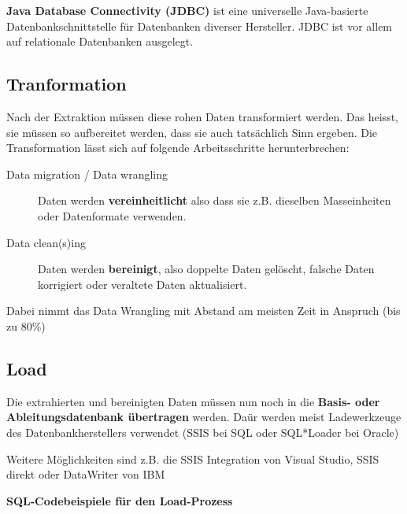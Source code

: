 \documentclass[a4paper, 11pt]{article}
\begin{document}
\vspace{10px}

\noindent \textbf{Java Database Connectivity (JDBC)} ist eine universelle Java-basierte Datenbankschnittstelle für Datenbanken diverser Hersteller. JDBC ist vor allem auf relationale Datenbanken ausgelegt.


\subsection{Tranformation}

Nach der Extraktion müssen diese rohen Daten transformiert werden. Das heisst, sie müssen so aufbereitet werden, dass sie auch tatsächlich Sinn ergeben. Die Transformation lässt sich auf folgende Arbeitsschritte herunterbrechen:

\begin{description}
	\item[Data migration / Data wrangling] Daten werden \textbf{vereinheitlicht} also dass sie z.B. dieselben Masseinheiten oder Datenformate verwenden.
	\item[Data clean(s)ing] Daten werden \textbf{bereinigt}, also doppelte Daten gelöscht, falsche Daten korrigiert oder veraltete Daten aktualisiert.
\end{description}

\vspace{10px}

\noindent Dabei nimmt das Data Wrangling mit Abstand am meisten Zeit in Anspruch (bis zu 80\%)


\subsection{Load}

Die extrahierten und bereinigten Daten müssen nun noch in die \textbf{Basis- oder Ableitungsdatenbank übertragen} werden. Daür werden meist Ladewerkzeuge des Datenbankherstellers verwendet (SSIS bei SQL oder SQL*Loader bei Oracle)

\vspace{10px}

\noindent 
Weitere Möglichkeiten sind z.B. die SSIS Integration von Visual Studio, SSIS direkt oder DataWriter von IBM

\vspace{10px}

\textbf{SQL-Codebeispiele für den Load-Prozess}

\vspace{10px}
\end{document}
